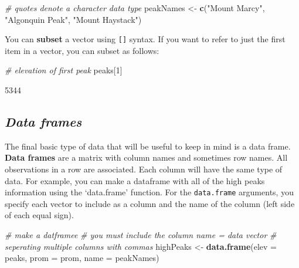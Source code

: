 \documentclass[
]{book}
\newenvironment{Shaded}{\begin{snugshade}}{\end{snugshade}}
\newcommand{\AttributeTok}[1]{\textcolor[rgb]{0.13,0.29,0.53}{#1}}
\newcommand{\CommentTok}[1]{\textcolor[rgb]{0.56,0.35,0.01}{\textit{#1}}}
\newcommand{\DecValTok}[1]{\textcolor[rgb]{0.00,0.00,0.81}{#1}}
\newcommand{\FunctionTok}[1]{\textcolor[rgb]{0.13,0.29,0.53}{\textbf{#1}}}
\newcommand{\NormalTok}[1]{#1}
\newcommand{\OtherTok}[1]{\textcolor[rgb]{0.56,0.35,0.01}{#1}}
\newcommand{\StringTok}[1]{\textcolor[rgb]{0.31,0.60,0.02}{#1}}
\theoremstyle{definition}
\theoremstyle{definition}
\theoremstyle{definition}
\theoremstyle{definition}
\theoremstyle{remark}
\begin{document}
\begin{Shaded}
\begin{Highlighting}[]
\CommentTok{\# quotes denote a character data type}
\NormalTok{peakNames }\OtherTok{\textless{}{-}} \FunctionTok{c}\NormalTok{(}\StringTok{"Mount Marcy"}\NormalTok{, }\StringTok{"Algonquin Peak"}\NormalTok{, }\StringTok{"Mount Haystack"}\NormalTok{)}
\end{Highlighting}
\end{Shaded}

You can \textbf{subset} a vector using \texttt{{[}{]}} syntax. If you want to refer to just the first item in a vector, you can subset as follows:

\begin{Shaded}
\begin{Highlighting}[]
\CommentTok{\# elevation of first peak}
\NormalTok{peaks[}\DecValTok{1}\NormalTok{]}
\end{Highlighting}
\end{Shaded}

\begin{Shaded}
\begin{Highlighting}[]
\NormalTok{[1] 5344}
\end{Highlighting}
\end{Shaded}

\hypertarget{data-frames}{%
\subsection{\texorpdfstring{\emph{Data frames}}{Data frames}}\label{data-frames}}

The final basic type of data that will be useful to keep in mind is a data frame. \textbf{Data frames} are a matrix with column names and sometimes row names. All observations in a row are associated. Each column will have the same type of data. For example, you can make a dataframe with all of the high peaks information using the `data.frame' function. For the \texttt{data.frame} arguments, you specify each vector to include as a column and the name of the column (left side of each equal sign).

\begin{Shaded}
\begin{Highlighting}[]
\CommentTok{\# make a datframee}
\CommentTok{\# you must include the column name = data vector}
\CommentTok{\# seperating multiple columns with commas}
\NormalTok{highPeaks }\OtherTok{\textless{}{-}} \FunctionTok{data.frame}\NormalTok{(}\AttributeTok{elev =}\NormalTok{ peaks,}
                        \AttributeTok{prom =}\NormalTok{ prom,}
                        \AttributeTok{name =}\NormalTok{ peakNames)}
\end{Highlighting}
\end{Shaded}
\end{document}
